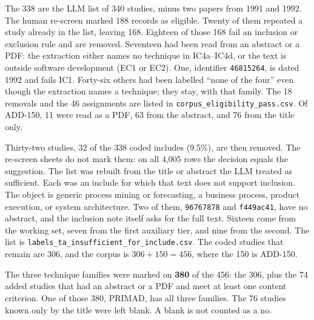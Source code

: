 The 338 are the LLM list of 340 studies, minus two papers from 1991 and
1992. The human re-screen marked 188 records as eligible. Twenty of them
repeated a study already in the list, leaving 168. Eighteen of those 168
fail an inclusion or exclusion rule and are removed. Seventeen had been
read from an abstract or a PDF: the extraction either names no technique
in IC4a--IC4d, or the text is outside software development (EC1 or EC2).
One, identifier \texttt{46815264}, is dated 1992 and fails IC1. Forty-six
others had been labelled ``none of the four'' even though the extraction
names a technique; they stay, with that family. The 18 removals and the
46 assignments are listed in \texttt{corpus\_eligibility\_pass.csv}. Of
ADD-150, 11 were read as a PDF, 63 from the abstract, and 76 from
the title only.

Thirty-two studies, 32 of the 338 coded includes (9.5\%), are then
removed. The re-screen sheets do not mark them: on all 4{,}005 rows the
decision equals the suggestion. The list was rebuilt from the title or
abstract the LLM treated as sufficient. Each was an include for which
that text does not support inclusion. The object is generic
process mining or forecasting, a business process, product execution, or
system architecture. Two of them, \texttt{96767878} and \texttt{f449ac41},
have no abstract, and the inclusion note itself asks for the full text.
Sixteen come from the working set, seven from the first auxiliary tier,
and nine from the second. The list is
\texttt{labels\_ta\_insufficient\_for\_include.csv}. The coded studies that
remain are 306, and the corpus is $306 + 150 = 456$, where the 150 is
ADD-150.

The three technique families were marked on \textbf{380} of the 456: the
306, plus the 74 added studies that had an abstract or a PDF and meet at
least one content criterion. One of those 380, PRIMAD, has all three
families. The 76 studies known only by the title were left blank. A blank
is not counted as a no.

